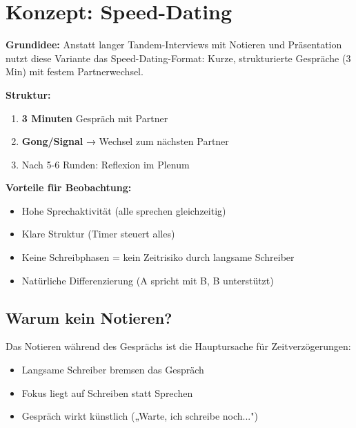 \documentclass[11pt, a4paper]{article}
\begin{document}
\newpage

\tableofcontents
\newpage


\section{Konzept: Speed-Dating}

\begin{alternativebox}
\textbf{Grundidee:} Anstatt langer Tandem-Interviews mit Notieren und Präsentation nutzt diese Variante das Speed-Dating-Format: Kurze, strukturierte Gespräche (3 Min) mit festem Partnerwechsel.

\textbf{Struktur:}
\begin{enumerate}[nosep]
    \item \textbf{3 Minuten} Gespräch mit Partner
    \item \textbf{Gong/Signal} → Wechsel zum nächsten Partner
    \item Nach 5-6 Runden: Reflexion im Plenum
\end{enumerate}

\textbf{Vorteile für Beobachtung:}
\begin{itemize}[nosep]
    \item Hohe Sprechaktivität (alle sprechen gleichzeitig)
    \item Klare Struktur (Timer steuert alles)
    \item Keine Schreibphasen = kein Zeitrisiko durch langsame Schreiber
    \item Natürliche Differenzierung (A spricht mit B, B unterstützt)
\end{itemize}
\end{alternativebox}

\subsection{Warum kein Notieren?}

Das Notieren während des Gesprächs ist die Hauptursache für Zeitverzögerungen:
\begin{itemize}
    \item Langsame Schreiber bremsen das Gespräch
    \item Fokus liegt auf Schreiben statt Sprechen
    \item Gespräch wirkt künstlich („Warte, ich schreibe noch...")
\end{itemize}
\end{document}
